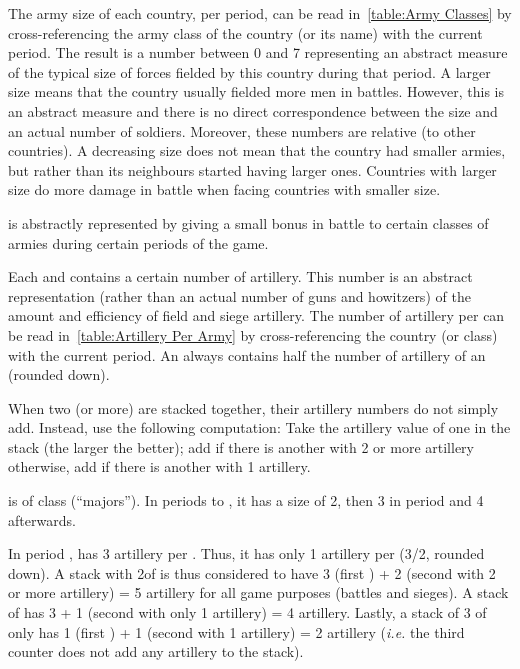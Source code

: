 
\aparag[Size.] The army size of each country, per period, can be read
in~\ref{table:Army Classes} by cross-referencing the army class of the country
(or its name) with the current period.
\bparag The result is a number between 0 and 7 representing an abstract
measure of the typical size of forces fielded by this country during that
period.
\bparag A larger size means that the country usually fielded more men in
battles. However, this is an abstract measure and there is no direct
correspondence between the size and an actual number of soldiers. Moreover,
these numbers are relative (to other countries). A decreasing size does not
mean that the country had smaller armies, but rather than its neighbours
started having larger ones.
\bparag Countries with larger size do more damage in battle when facing
countries with smaller size.

\aparag[Cavalry] is abstractly represented by giving a small bonus in battle
to certain classes of armies during certain periods of the game.

\aparag[Artillery.] Each \ARMY\facemoins and \ARMY\faceplus contains a certain
number of artillery. This number is an abstract representation (rather than an
actual number of guns and howitzers) of the amount and efficiency of field and
siege artillery.
\bparag The number of artillery per \ARMY\faceplus can be read
in~\ref{table:Artillery Per Army} by cross-referencing the country (or class)
with the current period.
\bparag An \ARMY\facemoins always contains half the number of artillery of an
\ARMY\faceplus (rounded down).


\label{chMilitary:Stacks:Artillery}
When two (or more) \ARMY are stacked together,
their artillery numbers do not simply add. Instead, use the following
computation:
\bparag Take the artillery value of one \ARMY in the stack (the larger the
better); add  if there is another \ARMY with 2 or more artillery
otherwise, add  if there is another \ARMY with 1 artillery.

\begin{exemple}
  \FRA is of class \CAIV (``majors''). In periods  to ,
  it has a size of 2, then 3 in period  and 4 afterwards.

  In period , \FRA has 3 artillery per \ARMY\faceplus. Thus, it has
  only 1 artillery per \ARMY\facemoins (3/2, rounded down). A stack with
  2\ARMY\faceplus of \FRA is thus considered to have 3 (first \ARMY) + 2
  (second \ARMY with 2 or more artillery) = 5 artillery for all game purposes
  (battles and sieges). A stack of \ARMY\faceplus \ARMY\facemoins has 3 + 1
  (second \ARMY with only 1 artillery) = 4 artillery. Lastly, a stack of 3
  \ARMY\facemoins of \FRA only has 1 (first \ARMY) + 1 (second \ARMY with 1
  artillery) = 2 artillery (\emph{i.e.} the third \ARMY counter does not add
  any artillery to the stack).
\end{exemple}



